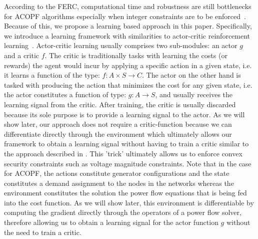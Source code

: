 According to the FERC, computational time and robustness are still bottlenecks for ACOPF algorithms especially when integer constraints are to be enforced~\cite{ferc2012history}. Because of this, we propose a learning based approach in this paper. Specifically, we introduce a learning framework with similarities to actor-critic reinforcement learning~\cite{barto2004j}. Actor-critic learning usually comprises two sub-modules: an actor $g$ and a critic $f$. The critic is traditionally tasks with learning the costs (or rewards) the agent would incur by applying a specific action in a given state, i.e. it learns a function of the type: $f: A \times S \rightarrow C$. The actor on the other hand is tasked with producing the action that minimizes the cost for any given state, i.e. the actor constitutes a function of type: $g: A \rightarrow S$, and usually receives the learning signal from the critic. After training, the critic is usually discarded because its sole purpose is to provide a learning signal to the actor. As we will show later, our approach does not require a critic-function because we can differentiate directly through the environment which ultimately allows our framework to obtain a learning signal without having to train a critic similar to the approach described in \cite{NIPS2018_7948}. This 'trick' ultimately allows us to enforce convex security constraints such as voltage magnitude constraints. Note that in the case for ACOPF, the actions constitute generator configurations and the state constitutes a demand assignment to the nodes in the networks whereas the environment constitutes the solution the power flow equations that is being fed into the cost function. As we will show later, this environment is differentiable by computing the gradient directly through the operators of a power flow solver, therefore allowing us to obtain a learning signal for the actor function $g$ without the need to train a critic.

